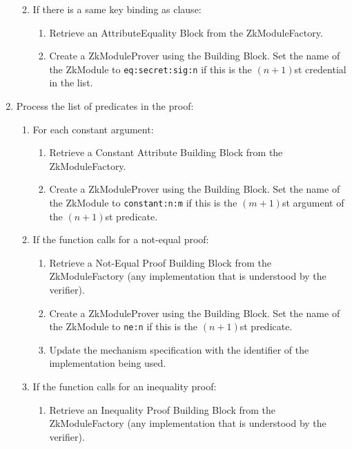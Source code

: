 \begin{enumerate}
\begin{enumerate}
\begin{enumerate}
            \end{enumerate}
          \item If there is a same key binding as clause:
            \begin{enumerate}
              \item Retrieve an AttributeEquality Block from the ZkModuleFactory.
              \item Create a ZkModuleProver using the Building Block. Set the name of the ZkModule to
                \texttt{eq:secret:sig:n} if this is the $(n+1)$st credential in the list.
            \end{enumerate}
        \end{enumerate}
      \item Process the list of predicates in the proof:
        \begin{enumerate}
          \item For each constant argument:
            \begin{enumerate}
              \item Retrieve a Constant Attribute Building Block from the ZkModuleFactory.
              \item Create a ZkModuleProver using the Building Block. Set the name of the ZkModule to
                \texttt{constant:n:m} if this is the $(m+1)$st argument of the $(n+1)$st predicate.
            \end{enumerate}
          \item If the function calls for a not-equal proof: \notimplemented
            \begin{enumerate}
              \item Retrieve a Not-Equal Proof Building Block from the ZkModuleFactory (any implementation that is understood by the verifier).
              \item Create a ZkModuleProver using the Building Block. Set the name of the ZkModule to
                \texttt{ne:n} if this is the $(n+1)$st predicate.
              \item Update the mechanism specification with the identifier of the implementation being used.
            \end{enumerate}
          \item If the function calls for an inequality proof:
            \begin{enumerate}
              \item Retrieve an Inequality Proof Building Block from the ZkModuleFactory (any implementation that is understood by the verifier).

\end{enumerate}
\end{enumerate}
\end{enumerate}
